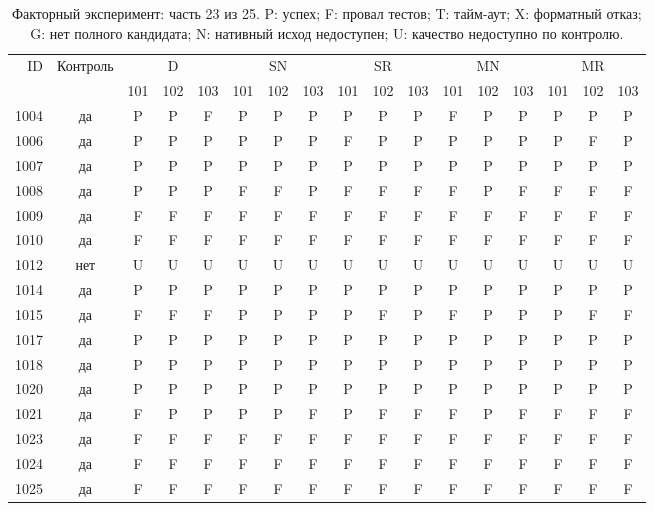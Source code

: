 \begin{table}[p]\centering\footnotesize
\setlength{\tabcolsep}{3pt}
\caption{Факторный эксперимент: часть 23 из 25. P: успех; F: провал тестов; T: тайм-аут; X: форматный отказ; G: нет полного кандидата; N: нативный исход недоступен; U: качество недоступно по контролю.}
\begin{tabular*}{\textwidth}{@{\extracolsep{\fill}}rcccccccccccccccc}\toprule
ID & Контроль & \multicolumn{3}{c}{D} & \multicolumn{3}{c}{SN} & \multicolumn{3}{c}{SR} & \multicolumn{3}{c}{MN} & \multicolumn{3}{c}{MR}\\
\cmidrule(lr){3-5}\cmidrule(lr){6-8}\cmidrule(lr){9-11}\cmidrule(lr){12-14}\cmidrule(lr){15-17}
 & & 101 & 102 & 103 & 101 & 102 & 103 & 101 & 102 & 103 & 101 & 102 & 103 & 101 & 102 & 103\\\midrule
1004 & да & P & P & F & P & P & P & P & P & P & F & P & P & P & P & P\\
1006 & да & P & P & P & P & P & P & F & P & P & P & P & P & P & F & P\\
1007 & да & P & P & P & P & P & P & P & P & P & P & P & P & P & P & P\\
1008 & да & P & P & P & F & F & P & F & F & F & F & P & F & F & F & F\\
1009 & да & F & F & F & F & F & F & F & F & F & F & F & F & F & F & F\\
1010 & да & F & F & F & F & F & F & F & F & F & F & F & F & F & F & F\\
1012 & нет & U & U & U & U & U & U & U & U & U & U & U & U & U & U & U\\
1014 & да & P & P & P & P & P & P & P & P & P & P & P & P & P & P & P\\
1015 & да & F & F & F & P & P & P & P & F & P & F & P & P & P & F & F\\
1017 & да & P & P & P & P & P & P & P & P & P & P & P & P & P & P & P\\
1018 & да & P & P & P & P & P & P & P & P & P & P & P & P & P & P & P\\
1020 & да & P & P & P & P & P & P & P & P & P & P & P & P & P & P & P\\
1021 & да & F & P & P & P & P & F & P & F & F & F & P & F & F & F & F\\
1023 & да & F & F & F & F & F & F & F & F & F & F & F & F & F & F & F\\
1024 & да & F & F & F & F & F & F & F & F & F & F & F & F & F & F & F\\
1025 & да & F & F & F & F & F & F & F & F & F & F & F & F & F & F & F\\

\end{tabular*}
\end{table}
